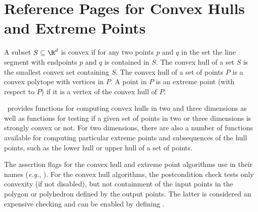 
\clearpage
\section{Reference Pages for Convex Hulls and Extreme Points}

A subset $S \subseteq \R^d$ is convex if for any two points $p$ and $q$
in the set the line segment with endpoints $p$ and $q$ is contained
in $S$. The convex hull of a set $S$ is 
the smallest convex set containing
$S$. The convex hull of a set of points $P$ is a convex 
polytope with vertices in $P$.  A point in $P$ is an extreme point 
(with respect to $P$) if it is a vertex 
of the convex hull of $P$.

\cgal\ provides functions for computing convex hulls in two and three 
dimensions as well as functions for testing if a given set of points
in two or three dimensions is strongly convex or not.  For two dimensions,
there are also a number of functions available for computing particular
extreme points and subsequences of the hull points, such as the lower
hull or upper hull of a set of points.


The assertion flags for the convex hull and extreme point algorithms
use  in their names (\textit{e.g.}, ).
For the convex hull algorithms, the postcondition
check tests only convexity (if not disabled), but not containment of the
input points in the polygon or polyhedron defined by the output points.
The latter is considered an expensive checking and can be enabled by
defining %
.



\\
\\
 \\

